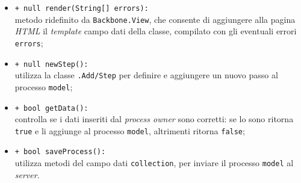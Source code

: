 \begin{flushleft}
\begin{itemize}
\begin{sloppypar}
\begin{itemize}
\item \texttt{+ null render(String[] errors):}\\ metodo ridefinito da \texttt{Backbone.View}, che consente di aggiungere alla pagina \textit{HTML} il \textit{template} campo dati della classe, compilato con gli eventuali errori \texttt{errors};
\item \texttt{+ null newStep():}\\ utilizza la classe \texttt{\logicAdmin{}.Add\fshyp{}Step} per definire e aggiungere un nuovo passo al processo \texttt{model};
\item \texttt{+ bool getData():}\\ controlla se i dati inseriti dal \textit{process owner} sono corretti: se lo sono ritorna \texttt{true} e li aggiunge al processo \texttt{model}, altrimenti ritorna \texttt{false};
\item \texttt{+ bool saveProcess():}\\ utilizza metodi del campo dati \texttt{collection}, per inviare il processo \texttt{model} al \textit{server}.
\end{itemize}
\end{sloppypar}
\end{itemize}
\end{flushleft}

